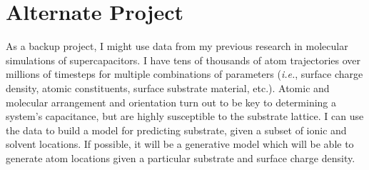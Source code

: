 \documentclass[12pt]{article}
\begin{document}


\section{Alternate Project}

As a backup project, I might use data from my previous research in molecular simulations of supercapacitors. I have tens of thousands of atom trajectories over millions of timesteps for multiple combinations of parameters (\textit{i.e.}, surface charge density, atomic constituents, surface substrate material, etc.). Atomic and molecular arrangement and orientation turn out to be key to determining a system's capacitance, but are highly susceptible to the substrate lattice. I can use the data to build a model for predicting substrate, given a subset of ionic and solvent locations. If possible, it will be a generative model which will be able to generate atom locations given a particular substrate and surface charge density.
\end{document}
